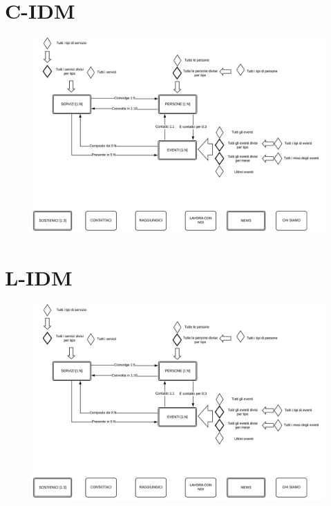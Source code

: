    \section{C-IDM}
    \begin{figure}[H]
        \centering
        \includegraphics[scale=0.6]{resources/images/c-idm.png}
    \end{figure}
    \section{L-IDM}
    \begin{figure}[H]
        \centering
        \includegraphics[scale=0.6]{resources/images/c-idm.png}
    \end{figure}
